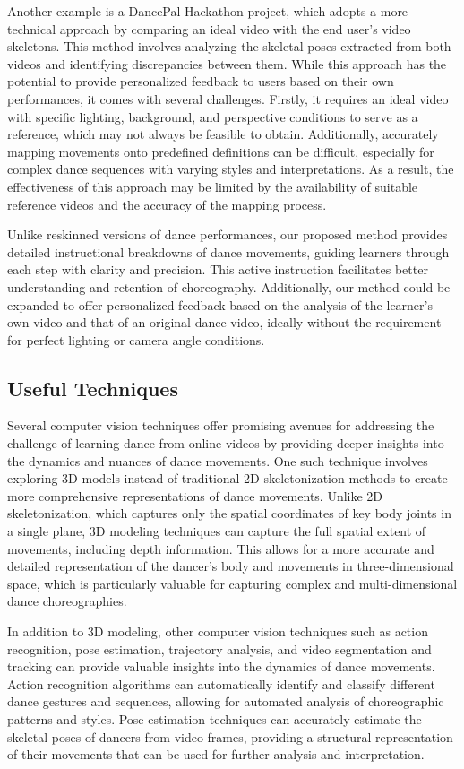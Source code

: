 Another example is a DancePal Hackathon project, which adopts a more technical approach by 
comparing an ideal video with the end user's video skeletons. This method involves analyzing the 
skeletal poses extracted from both videos and identifying discrepancies between them. While this 
approach has the potential to provide personalized feedback to users based on their own performances, 
it comes with several challenges. Firstly, it requires an ideal video with specific lighting, 
background, and perspective conditions to serve as a reference, which may not always be feasible 
to obtain. Additionally, accurately mapping movements onto predefined definitions can be difficult, 
especially for complex dance sequences with varying styles and interpretations. As a result, the 
effectiveness of this approach may be limited by the availability of suitable reference videos and 
the accuracy of the mapping process.

Unlike reskinned versions of dance performances, our proposed method provides detailed instructional 
breakdowns of dance movements, guiding learners through each step with clarity and precision. This 
active instruction facilitates better understanding and retention of choreography. Additionally, our 
method could be expanded to offer personalized feedback based on the analysis of the learner's own 
video and that of an original dance video, ideally without the requirement for perfect lighting or 
camera angle conditions.


\subsection{Useful Techniques}
Several computer vision techniques offer promising avenues for addressing the challenge of learning 
dance from online videos by providing deeper insights into the dynamics and nuances of dance 
movements. One such technique involves exploring 3D models instead of traditional 2D skeletonization
 methods to create more comprehensive representations of dance movements. Unlike 2D skeletonization, 
 which captures only the spatial coordinates of key body joints in a single plane, 3D modeling 
 techniques can capture the full spatial extent of movements, including depth information. This 
 allows for a more accurate and detailed representation of the dancer's body and movements in 
 three-dimensional space, which is particularly valuable for capturing complex and multi-dimensional 
 dance choreographies.

 In addition to 3D modeling, other computer vision techniques such as action recognition, pose 
estimation, trajectory analysis, and video segmentation and tracking can provide valuable insights 
into the dynamics of dance movements. Action recognition algorithms can automatically identify and 
classify different dance gestures and sequences, allowing for automated analysis of choreographic 
patterns and styles. Pose estimation techniques can accurately estimate the skeletal poses of 
dancers from video frames, providing a structural representation of their movements that can be 
used for further analysis and interpretation.

